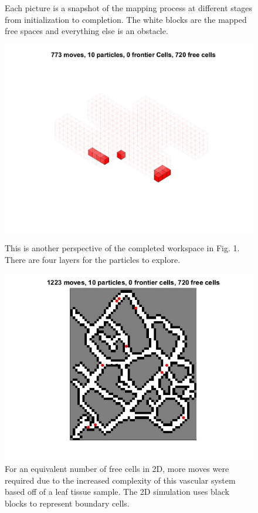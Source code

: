 \documentclass[letterpaper, 9 pt, conference]{ieeeconf}  %
\begin{document}
\begin{figure}
	\caption{Each picture is a snapshot of the mapping process at different stages from initialization to completion. The white blocks are the mapped free spaces and everything else is an obstacle.}
	\includegraphics[height=0.18\paperheight]{10particles_3D.jpg}
	\caption{This is another perspective of the completed workspace in Fig. 1. There are four layers for the particles to explore.}
	\includegraphics[height=0.18\paperheight]{10particles_final.jpg}
	\caption{For an equivalent number of free cells in 2D, more moves were required due to the increased complexity of this vascular system based off of a leaf tissue sample. The 2D simulation uses black blocks to represent boundary cells.}
\end{figure}


\end{document}
